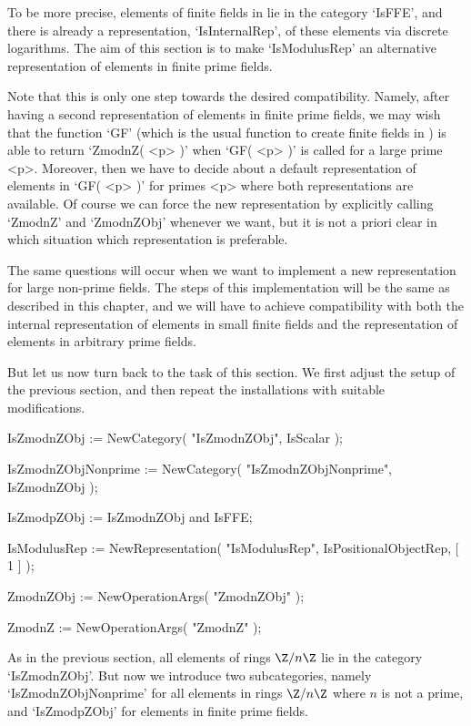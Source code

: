 To be more precise,
elements of finite fields in {\GAP} lie in the category `IsFFE',
and there is already a representation, `IsInternalRep', of these elements
via discrete logarithms.
The aim of this section is to make `IsModulusRep' an alternative
representation of elements in finite prime fields.

Note that this is only one step towards the desired compatibility.
Namely, after having a second representation of elements in finite
prime fields, we may wish that the function `GF' (which is the usual
function to create finite fields in {\GAP}) is able to return
`ZmodnZ( <p> )' when `GF( <p> )' is called for a large prime <p>.
Moreover, then we have to decide about a default representation of
elements in `GF( <p> )' for primes <p> where both representations are
available.
Of course we can force the new representation by explicitly calling
`ZmodnZ' and `ZmodnZObj' whenever we want, but it is not a priori
clear in which situation which representation is preferable.

The same questions will occur when we want to implement a new
representation for large non-prime fields.
The steps of this implementation will be the same as described in this
chapter,
and we will have to achieve compatibility with both the internal
representation of elements in small finite fields and the representation
of elements in arbitrary prime fields.

But let us now turn back to the task of this section.
We first adjust the setup of the previous section,
and then repeat the installations with suitable modifications.

\begintt
    IsZmodnZObj := NewCategory( "IsZmodnZObj", IsScalar );

    IsZmodnZObjNonprime := NewCategory( "IsZmodnZObjNonprime",
        IsZmodnZObj );

    IsZmodpZObj := IsZmodnZObj and IsFFE;

    IsModulusRep := NewRepresentation( "IsModulusRep",
        IsPositionalObjectRep,
        [ 1 ] );

    ZmodnZObj := NewOperationArgs( "ZmodnZObj" );

    ZmodnZ := NewOperationArgs( "ZmodnZ" );
\endtt

As in the previous section,
all elements of rings $\Z/n\Z$ lie in the category `IsZmodnZObj'.
But now we introduce two subcategories, namely `IsZmodnZObjNonprime'
for all elements in rings $\Z/n\Z$ where $n$ is not a prime,
and `IsZmodpZObj' for elements in finite prime fields.

